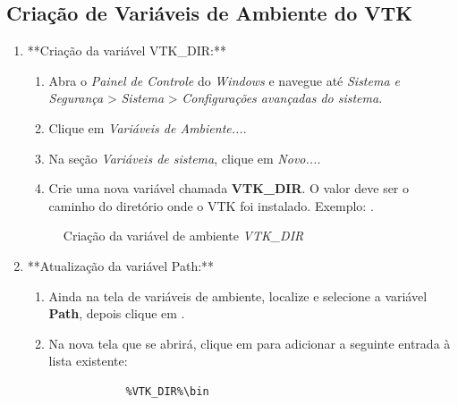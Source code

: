 \documentclass[a4paper,11pt]{article}
\newcommand{\windows}{\textit{Windows}}
\begin{document}
\subsection*{Criação de Variáveis de Ambiente do VTK}

\begin{enumerate}
	\item **Criação da variável VTK\_DIR:**
	\begin{enumerate}
		\item Abra o \textit{Painel de Controle} do \windows{} e navegue até \textit{Sistema e Segurança} > \textit{Sistema} > \textit{Configurações avançadas do sistema}.
		\item Clique em \textit{Variáveis de Ambiente...}.
		\item Na seção \textit{Variáveis de sistema}, clique em \textit{Novo...}.
		\item Crie uma nova variável chamada \textbf{VTK\_DIR}. O valor deve ser o caminho do diretório onde o VTK foi instalado. Exemplo: .
	\end{enumerate}
	
	\begin{figure}[H]\centering
		\caption{Criação da variável de ambiente \emph{VTK\_DIR}}\label{fig:vtkdirenv}
	\end{figure}
	
	\item **Atualização da variável Path:**
	\begin{enumerate}
		\item Ainda na tela de variáveis de ambiente, localize e selecione a variável \textbf{Path}, depois clique em .
		\item Na nova tela que se abrirá, clique em  para adicionar a seguinte entrada à lista existente:
		\begin{mdframed}
		\begin{verbatim}
			%VTK_DIR%\bin
		\end{verbatim}
		\end{mdframed}
	\end{enumerate}
	

\end{enumerate}
\end{document}
